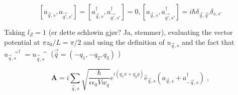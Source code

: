 \documentclass{article}
\begin{document}
\begin{equation}
    \left[a_{\vec{q},s}, a_{\vec{q'},s'}\right] = \left[a_{\vec{q},s}^{\dagger}, a_{\vec{q'},s'}^{\dagger}\right] = 0, \left[a_{\vec{q},s}, a_{\vec{q'},s'}^{\dagger}\right] = i \hbar \delta_{\vec{q}, \vec{q}'} \delta_{s,s'}
\end{equation}

Taking $l_Z = 1$ (er dette schlawin gjør? Ja, stemmer), evaluating the vector potential at $\pi z_0 / L = \pi / 2$ and using the definition of $u_{\vec{q},s}$ and the fact that $u_{\vec{q},s}̃^{\dagger} = u_{\vec{\bar{q}},s}̃$ ($\vec{\bar{q}} = (-q_1, -q_2, q_3)$ )

\begin{equation}
    \textbf{A} = i \sum_{\vec{q},s} \sqrt{\frac{\hbar}{\epsilon \epsilon_0 V w_q}} e^{i(q_x x + q_y y )} \hat{e}_{\vec{q},s}\left(a_{\vec{q},s} + a_{-\vec{q}, s}^{\dagger}\right) \;,
    \label{vector potential cavity}
\end{equation}
\end{document}
